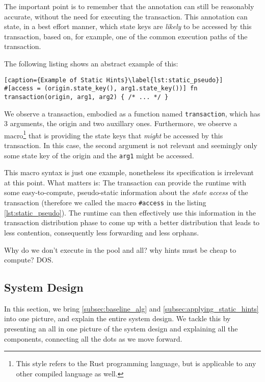 The important point is to remember that the annotation can still be reasonably accurate, without the
need for executing the transaction. This annotation can state, in a best effort manner, which state
keys are \textit{likely} to be accessed by this transaction, based on, for example, one of the
common execution paths of the transaction.

The following listing shows an abstract example of this:

\begin{lstlisting}[caption={Example of Static Hints}\label{lst:static_pseudo}]
#[access = (origin.state_key(), arg1.state_key())] fn transaction(origin, arg1, arg2) { /* ... */ }
\end{lstlisting}

We observe a transaction, embodied as a function named \texttt{transaction}, which has 3 arguments,
the origin and two auxillary ones. Furthermore, we observe a macro\footnote{This style refers to the
Rust programming language, but is applicable to any other compiled language as well.} that is
providing the state keys that \textit{might} be accessed by this transaction. In this case, the
second argument is not relevant and seemingly only some state key of the origin and the
\texttt{arg1} might be accessed.

This macro syntax is just one example, nonetheless its specification is irrelevant at this point.
What matters is: The transaction can provide the runtime with some easy-to-compute, pseudo-static
information about the \textit{state access} of the transaction (therefore we called the macro
\texttt{\#access} in the listing \ref{lst:static_pseudo}). The runtime can then effectively use this
information in the transaction distribution phase to come up with a better distribution that leads
to less contention, consequently less forwarding and less orphans.

\begin{remark}
	Why do we don't execute in the pool and all? why hints must be cheap to compute? DOS.
\end{remark}

\subsection{System Design}

In this section, we bring \ref{subsec:baseline_alg} and \ref{subsec:applying_static_hints} into one
picture, and explain the entire system design. We tackle this by presenting an all in one picture of
the system design and explaining all the components, connecting all the dots as we move forward.

